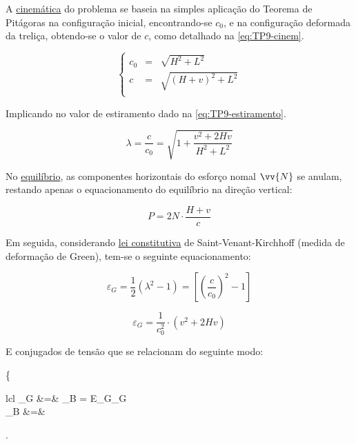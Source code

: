 \begin{textocaixa}
\hspace{10mm}

A \underline{cinemática} do problema se baseia na simples aplicação do Teorema de Pitágoras
na configuração inicial, encontrando-se $c_0$, e na configuração deformada da treliça,
obtendo-se o valor de $c$, como detalhado na \autoref{eq:TP9-cinem}.

\begin{equation}
	\left\{\begin{array}{lcl}
		c_0 &=& \sqrt{H^2 + L^2} \\ [5pt]
		c   &=& \sqrt{\left(H + v\right)^2 + L^2} \\
	\end{array}\right.
	\label{eq:TP9-cinem}
\end{equation}

Implicando no valor de estiramento dado na \autoref{eq:TP9-estiramento}.

\begin{equation}
	\lambda = \frac{c}{c_0} = \sqrt{1 + \frac{v^2 + 2Hv}{H^2 + L^2}}
	\label{eq:TP9-estiramento}
\end{equation}

No \underline{equilíbrio}, as componentes horizontais do esforço nomal $\vv{N}$ se anulam,
restando apenas o equacionamento do equilíbrio na direção vertical:

\begin{equation}
	P = 2N\cdot\frac{H + v}{c}
	\label{eq:TP9-equi}
\end{equation}

Em seguida, considerando \underline{lei constitutiva} de Saint-Venant-Kirchhoff (medida de
deformação de Green), tem-se o seguinte equacionamento:

$$\varepsilon_G = \frac{1}{2}\left(\lambda^2 - 1\right) =
\left[\left(\frac{c}{c_0}\right)^2 - 1\right]$$

\begin{equation}
	\varepsilon_G = \frac{1}{c_0^2}\cdot\left(v^2 + 2Hv\right)
	\label{eq:TP9-eG}
\end{equation}

E conjugados de tensão que se relacionam do seguinte modo:

\begin{bigEquation}
	\left\{\begin{array}{lcl}
		\sigma_G &=& \sigma_B = E_G\cdot \varepsilon_G \\ [10pt]
		\sigma_B &=&  \\
	\end{array}\right.
	\label{eq:TP9-SVK}
\end{bigEquation}


\end{textocaixa}
